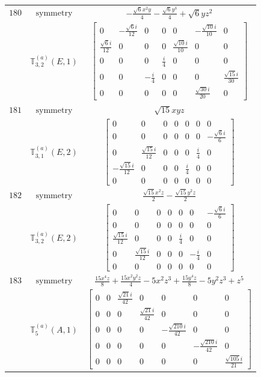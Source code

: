 \documentclass[fleqn,8pt,landscape]{jsarticle}
\begin{document}
\begin{longtable}{ccc}
$ 180 $ & $ \text{symmetry} $ & $ - \frac{\sqrt{6} x^{2} y}{4} - \frac{\sqrt{6} y^{3}}{4} + \sqrt{6} y z^{2} $ \\
$  $ & $ \mathbb{T}_{3,2}^{(a)}(E,1) $ & $ \begin{bmatrix} 0 & - \frac{\sqrt{6} i}{12} & 0 & 0 & 0 & - \frac{\sqrt{10} i}{10} & 0 \\ \frac{\sqrt{6} i}{12} & 0 & 0 & 0 & \frac{\sqrt{10} i}{10} & 0 & 0 \\ 0 & 0 & 0 & \frac{i}{4} & 0 & 0 & 0 \\ 0 & 0 & - \frac{i}{4} & 0 & 0 & 0 & \frac{\sqrt{15} i}{30} \\ 0 & 0 & 0 & 0 & 0 & \frac{\sqrt{30} i}{20} & 0 \end{bmatrix} $ \\ \hline
$ 181 $ & $ \text{symmetry} $ & $ \sqrt{15} x y z $ \\
$  $ & $ \mathbb{T}_{3,1}^{(a)}(E,2) $ & $ \begin{bmatrix} 0 & 0 & 0 & 0 & 0 & 0 & 0 \\ 0 & 0 & 0 & 0 & 0 & 0 & - \frac{\sqrt{6} i}{6} \\ 0 & \frac{\sqrt{15} i}{12} & 0 & 0 & 0 & \frac{i}{4} & 0 \\ - \frac{\sqrt{15} i}{12} & 0 & 0 & 0 & \frac{i}{4} & 0 & 0 \\ 0 & 0 & 0 & 0 & 0 & 0 & 0 \end{bmatrix} $ \\ \hline
$ 182 $ & $ \text{symmetry} $ & $ \frac{\sqrt{15} x^{2} z}{2} - \frac{\sqrt{15} y^{2} z}{2} $ \\
$  $ & $ \mathbb{T}_{3,2}^{(a)}(E,2) $ & $ \begin{bmatrix} 0 & 0 & 0 & 0 & 0 & 0 & - \frac{\sqrt{6} i}{6} \\ 0 & 0 & 0 & 0 & 0 & 0 & 0 \\ \frac{\sqrt{15} i}{12} & 0 & 0 & 0 & \frac{i}{4} & 0 & 0 \\ 0 & \frac{\sqrt{15} i}{12} & 0 & 0 & 0 & - \frac{i}{4} & 0 \\ 0 & 0 & 0 & 0 & 0 & 0 & 0 \end{bmatrix} $ \\ \hline
$ 183 $ & $ \text{symmetry} $ & $ \frac{15 x^{4} z}{8} + \frac{15 x^{2} y^{2} z}{4} - 5 x^{2} z^{3} + \frac{15 y^{4} z}{8} - 5 y^{2} z^{3} + z^{5} $ \\
$  $ & $ \mathbb{T}_{5}^{(a)}(A,1) $ & $ \begin{bmatrix} 0 & 0 & \frac{\sqrt{21} i}{42} & 0 & 0 & 0 & 0 \\ 0 & 0 & 0 & \frac{\sqrt{21} i}{42} & 0 & 0 & 0 \\ 0 & 0 & 0 & 0 & - \frac{\sqrt{210} i}{42} & 0 & 0 \\ 0 & 0 & 0 & 0 & 0 & - \frac{\sqrt{210} i}{42} & 0 \\ 0 & 0 & 0 & 0 & 0 & 0 & \frac{\sqrt{105} i}{21} \end{bmatrix} $ \\ \hline

\end{longtable}
\end{document}
